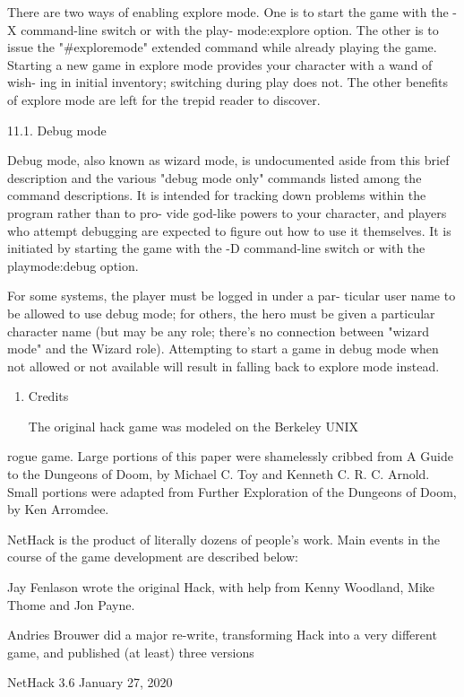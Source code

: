 \documentclass[11pt]{article}
\begin{document}
   There are two ways of enabling explore mode. One is to
start the game with the -X command-line switch or with the play-
mode:explore option.  The other is to issue the "\#exploremode"
extended command while already playing the game. Starting a new
game in explore mode provides your character with a wand of wish-
ing in initial inventory; switching during play does not.  The
other benefits of explore mode are left for the trepid reader to
discover.

11.1. Debug mode

   Debug mode, also known as wizard mode, is undocumented aside
from this brief description and the various "debug mode only"
commands listed among the command descriptions. It is intended
for tracking down problems within the program rather than to pro-
vide god-like powers to your character, and players who attempt
debugging are expected to figure out how to use it themselves.
It is initiated by starting the game with the -D command-line
switch or with the playmode:debug option.

   For some systems, the player must be logged in under a par-
ticular user name to be allowed to use debug mode; for others,
the hero must be given a particular character name (but may be
any role; there's no connection between "wizard mode" and the
Wizard role). Attempting to start a game in debug mode when not
allowed or not available will result in falling back to explore
mode instead.

\begin{enumerate}
\item Credits

The original hack game was modeled on the Berkeley UNIX
\end{enumerate}
rogue game.  Large portions of this paper were shamelessly
cribbed from A Guide to the Dungeons of Doom, by Michael C. Toy
and Kenneth C. R. C. Arnold. Small portions were adapted from
Further Exploration of the Dungeons of Doom, by Ken Arromdee.

   NetHack is the product of literally dozens of people's work.
Main events in the course of the game development are described
below:

   Jay Fenlason wrote the original Hack, with help from Kenny
Woodland, Mike Thome and Jon Payne.

   Andries Brouwer did a major re-write, transforming Hack into
a very different game, and published (at least) three versions


NetHack 3.6                   January 27, 2020
\end{document}
